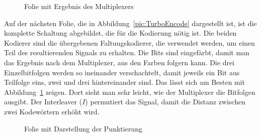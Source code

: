 \begin{figure}[th]
\centering
{}
\caption{Folie mit Ergebnis des Multiplexers}
\label{pic:TurboEncodeMultiplexer}
\end{figure}  

Auf der nächsten Folie, die in Abbildung~\ref{pic:TurboEncode} dargestellt ist, ist die komplette Schaltung abgebildet, die für die Kodierung nötig ist. Die beiden Kodierer sind die übergebenen Faltungskodierer, die verwendet werden, um einen Teil des resultierenden Signals zu erhalten. Die Bits sind eingefärbt, damit man das Ergebnis nach dem Multiplexer, aus den Farben folgern kann. Die drei Einzelbitfolgen werden so ineinander verschachtelt, damit jeweils ein Bit aus Teilfolge eins, zwei und drei hintereinander sind. Das lässt sich am Besten mit Abbildung~\ref{pic:TurboEncodeMultiplexer} zeigen. Dort sieht man sehr leicht, wie der Multiplexer die Bitfolgen ausgibt. Der Interleaver ($I$) permutiert das Signal, damit die Distanz zwischen zwei Kodewörtern erhöht wird.

\begin{figure}[th]
\centering
{}
\caption{Folie mit Darstellung der Punktierung}
\label{pic:TurboEncodePuncturing}
\end{figure}  

